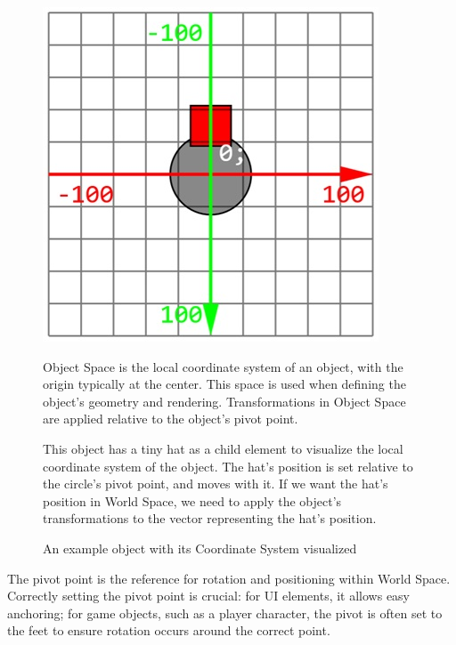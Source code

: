 \begin{figure}[h]
    \centering
    \begin{minipage}[t]{0.35\textwidth}
        \includegraphics[width=\linewidth]{img/object-space.jpg}
        \caption{An example object with its Coordinate System visualized}
    \end{minipage}\hfill
    \begin{minipage}[b]{0.6\textwidth}
        \setlength{\parskip}{1em}
        \setlength{\parindent}{0pt}
        Object Space is the local coordinate system of an object, with the origin typically at the center. This space is used when defining the object's geometry and rendering. Transformations in Object Space are applied relative to the object's pivot point.

        This object has a tiny hat as a child element to visualize the local coordinate system of the object. The hat's position is set relative to the circle's pivot point, and moves with it. If we want the hat's position in World Space, we need to apply the object's transformations to the vector representing the hat's position.
    \end{minipage}
\end{figure}

\begin{Note}
    The pivot point is the reference for rotation and positioning within World Space. Correctly setting the pivot point is crucial: for UI elements, it allows easy anchoring; for game objects, such as a player character, the pivot is often set to the feet to ensure rotation occurs around the correct point.
\end{Note}

